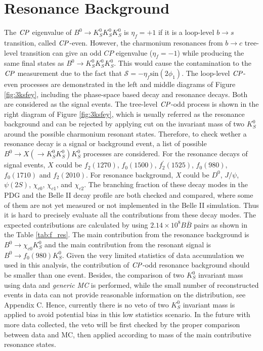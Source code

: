 \section{Resonance Background}

The $\it{CP}$ eigenvalue of $B^0 \to K_S^0  K_S^0  K_S^0$ is $\eta_f = +1$ if it is a loop-level $b\to s$ transition, called $\it{CP}$-even. However, the charmonium resonances from $b \to c$ tree-level transition can give an odd $\textit{CP}$ eigenvalue ($\eta_f = -1$) while producing the same final states as $B^0 \to K_S^0  K_S^0  K_S^0$.  This would cause the contamination to the $\it{CP}$ measurement due to the fact that $\mathcal{S} = -\eta_f\text{sin}(2\phi_1)$. The loop-level $\it{CP}$-even processes are demonstrated in the left and middle diagrams of Figure \ref{fig:3ksfey}, including the phase-space based decay and resonance decays. Both are considered as the signal events. The tree-level $\it{CP}$-odd process is shown in the right diagram of Figure \ref{fig:3ksfey}, which is usually referred as the resonance background and can be rejected by applying cut on the invariant mass of two $K_S^0$ around the possible charmonium resonant states. Therefore, to check wether a resonance decay is a signal or background event, a list of possible $B^0 \to X(\to K^0_S K^0_S) K^0_S$ processes are considered. For the resonance decays of signal events, $X$ could be $f_2(1270)$, $f_0(1500)$, $f_{2}^{'}(1525)$, $f_0(980)$, $f_0(1710)$ and $f_2(2010)$. For resonance background, \textit{X} could be $D^0$, $J/\psi$, $\psi(2S)$,  $\chi_{c0}$, $\chi_{c1}$, and $\chi_{c2}$.
The branching fraction of these decay modes in the PDG and the Belle II decay profile are both checked and compared, where some of them are not yet measured or not implemented in the Belle II simulation. Thus it is hard to precisely evaluate all the contributions from these decay modes. The expected contributions are calculated by using $2.14\times 10^8 B\bar{B}$ pairs as shown in the Table \ref{tab:f_res}. The main contribution from the resonance background is $B^0\to \chi_{c0} K^0_S$ and the main contribution from the resonant signal is $B^0\to f_0(980)K^0_S$. Given the very limited statistics of data accumulation we used in this analysis, the contribution of $\it{CP}$-odd resonance background should be smaller than one event. Besides, the comparison of two $K_S^0$ invariant mass using data and \textit{generic MC} is performed, while the small number of reconstructed events in data can not provide reasonable information on the distribution, see Appendix C. Hence, currently there is no veto of two $K_S^0$ invariant mass is applied to avoid potential bias in this low statistics scenario. In the future with more data collected, the veto will be first checked by the proper comparison between data and MC, then applied according to mass of the main contributive resonance states.
